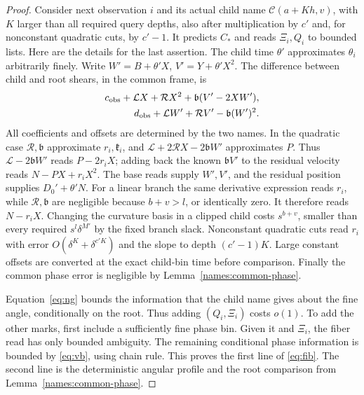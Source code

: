 \begin{proof}
Consider next observation \(i\) and its actual child name
\(\mathcal C(a+Kh,v)\), with \(K\) larger than all
required query depths, also after multiplication by \(c'\)
and, for nonconstant quadratic cuts, by \(c'-1\).
It predicts \(C_*\) and reads \(\Xi_i,Q_i\) to bounded
lists. Here are the details for the last assertion.
The child time \(\theta'\) approximates \(\theta_i\)
arbitrarily finely. Write
\(W'=B+\theta'X\), \(V'=Y+\theta'X^2\).
The difference between child and root shears, in the common
frame, is
\[
\begin{split}
 c_{\rm obs}+\mathcal LX+\mathcal RX^2
                 +\mathfrak b(V'-2XW'),\\
 d_{\rm obs}+\mathcal LW'+\mathcal RV'
                 -\mathfrak b(W')^2.
\end{split}
\]
All coefficients and offsets are determined by the two names.
In the quadratic case \(\mathcal R,\mathfrak b\) approximate
\(r_i,\mathfrak k_i\), and
\(\mathcal L+2\mathcal RX-2\mathfrak bW'\) approximates
\(P\). Thus \(\mathcal L-2\mathfrak bW'\) reads
\(P-2r_iX\); adding back the known
\(\mathfrak bV'\) to the residual velocity reads
\(N-PX+r_iX^2\). The base reads supply \(W',V'\), and
the residual position supplies \(D_0'+\theta' N\).
For a linear branch the same derivative expression reads
\(r_i\), while \(\mathcal R,\mathfrak b\) are negligible
because \(b+v>l\), or identically zero. It therefore reads
\(N-r_iX\). Changing the curvature basis in a clipped
child costs \(s^{b+v}\), smaller than every required
\(s^l\delta^{M'}\) by the fixed branch slack.
Nonconstant quadratic cuts read \(r_i\) with error
\(O(\delta^K+\delta^{c'K})\) and the slope to depth
\((c'-1)K\). Large constant offsets are converted at the
exact child-bin time before comparison. Finally the common
phase error is negligible by Lemma~\ref{names:common-phase}.

Equation~\eqref{eq:ng} bounds the information that the child
name gives about the fine angle, conditionally on the root.
Thus adding \((Q_i,\Xi_i)\) costs \(o(1)\).
To add the other marks, first include a sufficiently fine
phase bin. Given it and \(\Xi_i\), the fiber read has
only bounded ambiguity. The remaining conditional phase
information is bounded by \eqref{eq:vb}, using chain rule.
This proves the first line of \eqref{eq:fib}. The second
line is the deterministic angular profile and the root
comparison from Lemma~\ref{names:common-phase}.
\end{proof}


